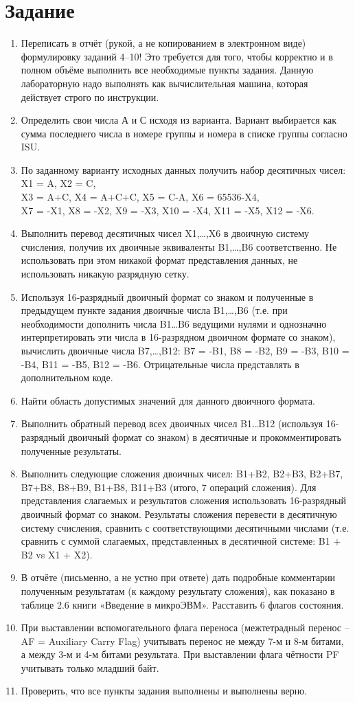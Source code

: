 \documentclass[11pt]{article}
\begin{document}
\section{Задание}
\begin{enumerate}
	\item Переписать в отчёт (рукой, а не копированием в электронном виде)
формулировку заданий 4–10! Это требуется для того, чтобы
корректно и в полном объёме выполнить все необходимые пункты
задания. Данную лабораторную надо выполнять как вычислительная
машина, которая действует строго по инструкции.
	\item Определить свои числа А и С исходя из варианта. Вариант выбирается
как сумма последнего числа в номере группы и номера в списке
группы согласно ISU.
	\item По заданному варианту исходных данных получить набор десятичных
чисел:\\
X1 = A, X2 = C,\\
X3 = A+C, X4 = A+C+C, X5 = C-A, X6 = 65536-X4,\\
X7 = -X1, X8 = -X2, X9 = -X3, X10 = -X4, X11 = -X5, X12 = -X6.
	\item Выполнить перевод десятичных чисел X1,…,X6 в двоичную систему
счисления, получив их двоичные эквиваленты B1,…,B6
соответственно.
Не использовать при этом никакой формат представления данных, не
использовать никакую разрядную сетку.
	\item Используя 16-разрядный двоичный формат со знаком и полученные в
предыдущем пункте задания двоичные числа B1,…,B6 (т.е. при
необходимости дополнить числа B1…B6 ведущими нулями и
однозначно интерпретировать эти числа в 16-разрядном двоичном
формате со знаком), вычислить двоичные числа B7,…,B12: B7 = -B1,
B8 = -B2, B9 = -B3, B10 = -B4, B11 = -B5, B12 = -B6. Отрицательные
числа представлять в дополнительном коде.
	\item Найти область допустимых значений для данного двоичного формата.
	\item Выполнить обратный перевод всех двоичных чисел B1…B12
(используя 16-разрядный двоичный формат со знаком) в десятичные
и прокомментировать полученные результаты.
	\item Выполнить следующие сложения двоичных чисел:
B1+B2, B2+B3, B2+B7, B7+B8, B8+B9, B1+B8, B11+B3 (итого, 7
операций сложения).
Для представления слагаемых и результатов сложения использовать
16-разрядный двоичный формат со знаком. Результаты сложения
перевести в десятичную систему счисления, сравнить с
соответствующими десятичными числами (т.е. сравнить с суммой
слагаемых, представленных в десятичной системе: B1 + B2 vs X1 +
X2).
	\item В отчёте (письменно, а не устно при ответе) дать подробные
комментарии полученным результатам (к каждому результату
сложения), как показано в таблице 2.6 книги «Введение в
микроЭВМ». Расставить 6 флагов состояния.
	\item При выставлении вспомогательного флага переноса (межтетрадный
перенос – AF = Auxiliary Carry Flag) учитывать перенос не между 7-м и
8-м битами, а между 3-м и 4-м битами результата. При выставлении
флага чётности PF учитывать только младший байт.
	\item Проверить, что все пункты задания выполнены и выполнены верно.
\end{enumerate}
\end{document}
